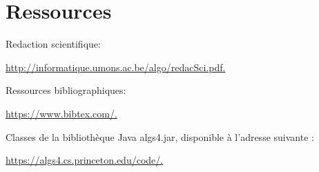 \documentclass{article}
\begin{document}
\newpage

\section{Ressources}

Redaction scientifique:

\href{http://informatique.umons.ac.be/algo/redacSci.pdf.}{http://informatique.umons.ac.be/algo/redacSci.pdf.
}

Ressources bibliographiques:

\href{https://www.bibtex.com/.}{https://www.bibtex.com/.}


Classes de la bibliothèque Java
algs4.jar, disponible à l’adresse suivante :

\href{https://algs4.cs.princeton.edu/code/.}{https://algs4.cs.princeton.edu/code/.}
\end{document}
